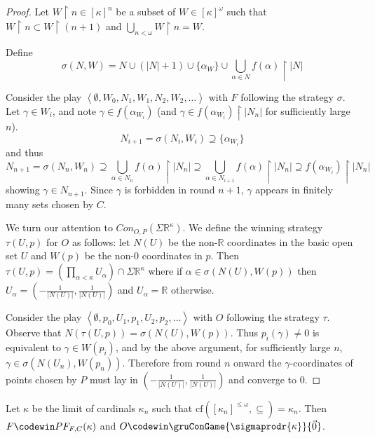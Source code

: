 \begin{proof}
Let $W\restriction n \in [\kappa]^n$ be a subset of $W\in[\kappa]^\omega$ such that $W\restriction n \subset W \restriction (n+1)$ and $\bigcup_{n<\omega} W\restriction n = W$.

Define \[\sigma(N,W) = N \cup (|N|+1) \cup \{\alpha_W\} \cup \bigcup_{\alpha \in N} f(\alpha) \restriction |N|\]

Consider the play $\left<\emptyset,W_0,N_1,W_1,N_2,W_2,\dots\right>$ with $F$ following the strategy $\sigma$. Let $\gamma \in W_i$, and note $\gamma \in f(\alpha_{W_i})$ (and $\gamma \in f(\alpha_{W_i})\restriction |N_n|$ for sufficiently large $n$). \[N_{i+1} = \sigma(N_i,W_i) \supseteq \{\alpha_{W_i}\}\] and thus \[N_{n+1} = \sigma(N_n,W_n) \supseteq \bigcup_{\alpha \in N_n} f(\alpha) \restriction |N_n| \supseteq \bigcup_{\alpha \in N_{i+1}} f(\alpha) \restriction |N_n| \supseteq f(\alpha_{W_i}) \restriction |N_n|\] showing $\gamma \in N_{n+1}$. Since $\gamma$ is forbidden in round $n+1$, $\gamma$ appears in finitely many sets chosen by $C$.

We turn our attention to $Con_{O,P}(\Sigma\mathbb{R}^\kappa)$. We define the winning strategy $\tau(U,p)$ for $O$ as follows: let $N(U)$ be the non-$\mathbb{R}$ coordinates in the basic open set $U$ and $W(p)$ be the non-$0$ coordinates in $p$. Then $\tau(U,p) = \left(\prod_{\alpha<\kappa} U_\alpha\right) \cap \Sigma\mathbb{R}^\kappa$ where if $\alpha \in \sigma(N(U),W(p))$ then $U_\alpha = (-\frac{1}{|N(U)|},\frac{1}{|N(U)|})$ and $U_\alpha=\mathbb{R}$ otherwise.

Consider the play $\left<\emptyset,p_0,U_1,p_1,U_2,p_2,\dots\right>$ with $O$ following the strategy $\tau$. Observe that $N(\tau(U,p))=\sigma(N(U),W(p))$. Thus $p_i(\gamma)\not=0$ is equivalent to $\gamma \in W(p_i)$, and by the above argument, for sufficiently large $n$, $\gamma \in \sigma(N(U_n),W(p_n))$. Therefore from round $n$ onward the $\gamma$-coordinates of points chosen by $P$ must lay in $(-\frac{1}{|N(U)|},\frac{1}{|N(U)|})$ and converge to $0$.
\end{proof}

\begin{thm}
Let $\kappa$ be the limit of cardinals $\kappa_n$ such that $\textrm{cf}([\kappa_n]^{\leq\omega},\subseteq)=\kappa_n$. Then $F \codewin PF_{F,C}(\kappa)$ and $O \codewin \gruConGame{\sigmaprodr{\kappa}}{\vec{0}}$.
\end{thm}

